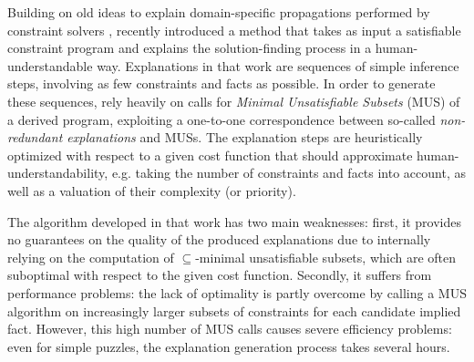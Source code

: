 


Building on old ideas to explain domain-specific propagations performed by constraint solvers  \cite{sqalli1996inference,freuder2001explanation}, \citet{ecai/BogaertsGCG20} recently introduced a 
method that takes as input a satisfiable constraint program and explains the solution-finding process in a human-understandable way. 
Explanations in that work are sequences of simple inference steps, involving as few constraints and facts as possible. 
In order to generate these sequences, \citeauthor{ecai/BogaertsGCG20} rely heavily on calls for  \emph{Minimal Unsatisfiable Subsets} (MUS) \cite{MUS} of a derived program, exploiting a one-to-one correspondence between so-called \emph{non-redundant explanations} and MUSs.
The explanation steps are heuristically optimized with respect to a given cost function that should approximate human-understandability, e.g. taking the number of constraints and facts into account, as well as a valuation of their complexity (or priority). 

The algorithm developed in that work has two main weaknesses: first, it provides no guarantees on the quality of the produced explanations due to internally relying on the computation of $\subseteq$-minimal unsatisfiable subsets, which are often suboptimal with respect to the given cost function. 
Secondly, it suffers from performance problems: the lack of optimality is partly overcome by calling a MUS algorithm on increasingly larger subsets of constraints for each candidate implied fact. %
However, this high number of MUS calls causes severe efficiency problems: even for simple puzzles, the explanation generation process takes several hours.



